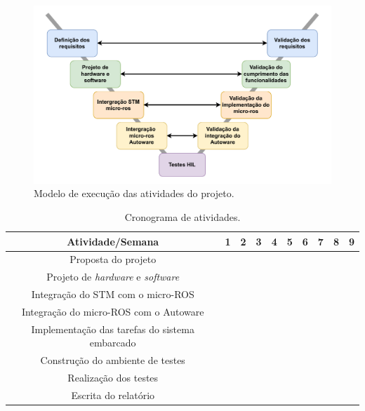 \begin{figure}[H]
	\centering
	\includegraphics[width=0.75\linewidth]{img/modelo-v}
	\caption{Modelo de execução das atividades do projeto.}
	\label{fig:modelo-v}
\end{figure}

\begin{table}[H]
	\centering
	\small{
		\begin{tabular}{|c|c|c|c|c|c|c|c|c|c|}
			\hline
			\textbf{Atividade/Semana} & 1 & \textbf{2} & 3 & \textbf{4} & 5 & 6 & \textbf{7} & 8 & \textbf{9} \\
			\hline
			Proposta do projeto  & \cellcolor{unifeiblue} &  &  &  &  &  &  &  &  \\
			\hline
			Projeto de \textit{hardware} e \textit{software}  &  & \cellcolor{unifeiblue} & \cellcolor{unifeiblue} &  &  &  &  &  &  \\
			\hline
			Integração do STM com o micro-ROS  &  & \cellcolor{unifeiblue} &  &  &  &  &  &  &  \\
			\hline
			Integração do micro-ROS com o Autoware  &  &  & \cellcolor{unifeiblue} & \cellcolor{unifeiblue} & \cellcolor{unifeiblue} &  &  &  &  \\
			\hline
			Implementação das tarefas do sistema embarcado  &  &  &  & \cellcolor{unifeiblue} & \cellcolor{unifeiblue} & \cellcolor{unifeiblue} & \cellcolor{unifeiblue} &  &  \\
			\hline
			Construção do ambiente de testes  &  &  &  &  & \cellcolor{unifeiblue} & \cellcolor{unifeiblue} & \cellcolor{unifeiblue} &  &  \\
			\hline
			Realização dos testes  &  &  &  &  &  &  & \cellcolor{unifeiblue} & \cellcolor{unifeiblue} & \cellcolor{unifeiblue} \\
			\hline
			Escrita do relatório  &   & \cellcolor{unifeiblue} & \cellcolor{unifeiblue} & \cellcolor{unifeiblue} & \cellcolor{unifeiblue} & \cellcolor{unifeiblue} & \cellcolor{unifeiblue} & \cellcolor{unifeiblue} & \cellcolor{unifeiblue} \\
			\hline
		\end{tabular}
	}
	\caption{Cronograma de atividades.}
	\label{tab:crono}
\end{table}

